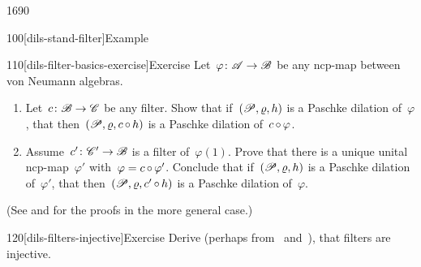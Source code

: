 \begin{parsec}{1690}
\begin{point}{100}[dils-stand-filter]{Example}
\end{point}
\begin{point}{110}[dils-filter-basics-exercise]{Exercise}%
Let~$\varphi\colon \mathscr{A} \to \mathscr{B}$ be any ncp-map
    between von Neumann algebras.
\begin{enumerate}
\item
    Let~$c \colon \mathscr{B} \to \mathscr{C}$ be any filter.
    Show that if~$(\mathscr{P}, \varrho, h)$ is a Paschke dilation
            of~$\varphi$,
    that then~$(\mathscr{P}, \varrho, c \mathop{\circ} h)$ is a Paschke dilation
        of~$c \mathop{\circ} \varphi$.
\item
    Assume~$c'\colon \mathscr{C}' \to \mathscr{B}$ is a filter of~$\varphi(1)$.
    Prove that there is a unique unital ncp-map~$\varphi'$
        with~$\varphi = c \mathop{\circ} \varphi'$.
    Conclude that if~$(\mathscr{P}, \varrho, h)$ is a Paschke dilation
            of~$\varphi'$,
            that then~$(\mathscr{P}, \varrho, c' \mathop{\circ} h)$
            is a Paschke dilation of~$\varphi$.
\end{enumerate}
(See  and  for the proofs
        in the more general case.)
\end{point}
\begin{point}{120}[dils-filters-injective]{Exercise}%
Derive (perhaps from~ and~),
    that filters are injective.
\end{point}
\end{parsec}

